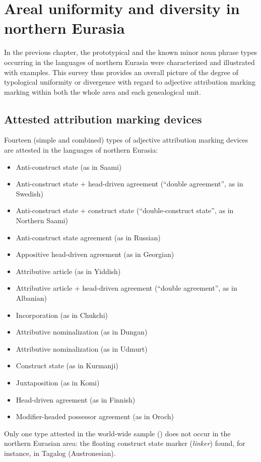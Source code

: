 
\chapter[Areal uniformity and diversity]{Areal uniformity and diversity in northern Eurasia}\label{areality}
In the previous chapter, the prototypical and the known minor noun phrase types occurring in the languages of northern Eurasia were characterized and illustrated with examples. This survey thus provides an overall picture of the degree of typological uniformity or divergence with regard to adjective attribution marking marking within both the whole area and each genealogical unit.

\section{Attested attribution marking devices}
Fourteen (simple and combined) types of adjective attribution marking devices are attested in the languages of northern Eurasia:
\begin{itemize}
\item Anti-construct state (as in Saami)
\item Anti-construct state + head-driven agreement (“double agreement”, as in Swedish)
\item Anti-construct state + construct state (“double-construct state”, as in Northern Saami)
\item Anti-construct state agreement (as in Russian)
\item Appositive head-driven agreement (as in Georgian)
\item Attributive article (as in Yiddish)
\item Attributive article + head-driven agreement (“double agreement”, as in Albanian)
\item Incorporation (as in Chukchi)
\item Attributive nominalization (as in Dungan)
\item Attributive nominalization (as in Udmurt)
\item Construct state (as in Kurmanji)
\item Juxtaposition (as in Komi)
\item Head-driven agreement (as in Finnish)
\item Modifier-headed possessor agreement (as in Oroch)
\end{itemize}
Only one type attested in the world-wide sample () does not occur in the northern Eurasian area: the floating construct state marker (\textit{linker}) found, for instance, in Tagalog (Austronesian). 

